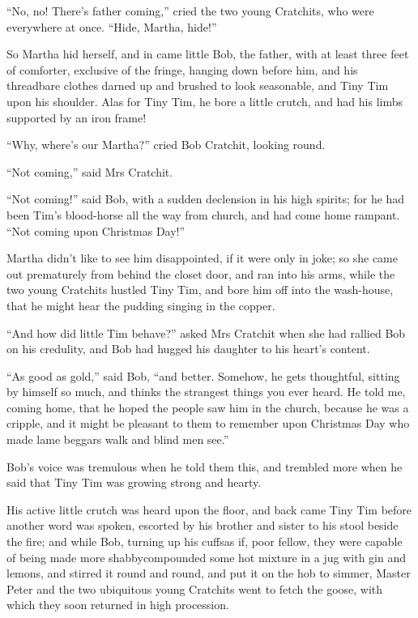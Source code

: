 \documentclass[paper=5.5in:8.5in,BCOR=5mm,twoside,DIV=calc,12pt,usegeometry]{scrbook} %
\begin{document}
\enquote{No, no! There's father coming,} cried the two young Cratchits, who were everywhere at once. \enquote{Hide, Martha, hide!}

So Martha hid herself, and in came little Bob, the father, with at least three feet of comforter, exclusive of the fringe, hanging down before him, and his threadbare clothes darned up and brushed to look seasonable, and Tiny Tim upon his shoulder. Alas for Tiny Tim, he bore a little crutch, and had his limbs supported by an iron frame!

\enquote{Why, where's our Martha?} cried Bob Cratchit, looking round.

\enquote{Not coming,} said Mrs Cratchit.


\enquote{Not coming!} said Bob, with a sudden declension in his high spirits; for he had been Tim's blood-horse all the way from church, and had come home rampant. \enquote{Not coming upon Christmas Day!}

Martha didn't like to see him disappointed, if it were only in joke; so she came out prematurely from behind the closet door, and ran into his arms, while the two young Cratchits hustled Tiny Tim, and bore him off into the wash-house, that he might hear the pudding singing in the copper.

\enquote{And how did little Tim behave?} asked Mrs Cratchit when she had rallied Bob on his credulity, and Bob had hugged his daughter to his heart's content.


\enquote{As good as gold,} said Bob, \enquote{and better. Somehow, he gets thoughtful, sitting by himself so much, and thinks the strangest things you ever heard. He told me, coming home, that he hoped the people saw him in the church, because he was a cripple, and it might be pleasant to them to remember upon Christmas Day who made lame beggars walk and blind men see.}



Bob's voice was tremulous when he told them this, and trembled more when he said that Tiny Tim was growing strong and hearty.

His active little crutch was heard upon the floor, and back came Tiny Tim before another word was spoken, escorted by his brother and sister to his stool beside the fire; and while Bob, turning up his cuffs\textemdash as if, poor fellow, they were capable of being made more shabby\textemdash compounded some hot mixture in a jug with gin and lemons, and stirred it round and round, and put it on the hob to simmer, Master Peter and the two ubiquitous young Cratchits went to fetch the goose, with which they soon returned in high procession.
\end{document}
